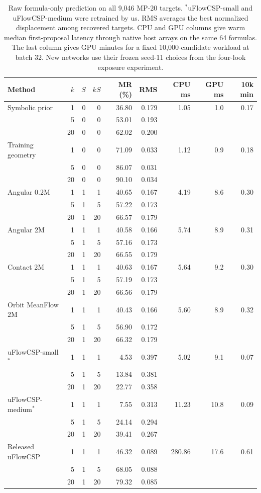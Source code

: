 \begin{table}[!htbp]\centering\small\setlength{\tabcolsep}{3.6pt}
\caption{Raw formula-only prediction on all 9,046 MP-20 targets. $^*$uFlowCSP-small and uFlowCSP-medium were retrained by us. RMS averages the best normalized displacement among recovered targets. CPU and GPU columns give warm median first-proposal latency through native host arrays on the same 64 formulas. The last column gives GPU minutes for a fixed 10,000-candidate workload at batch 32. New networks use their frozen seed-11 choices from the four-look exposure experiment.}\label{tab:main}
\begin{tabular}{lrrrrrrrr}\hline
Method & $k$ & $S$ & $kS$ & MR (\%) & RMS & CPU ms & GPU ms & 10k min\\\hline
Symbolic prior & 1 & 0 & 0 & 36.80 & 0.179 & 1.05 & 1.0 & 0.17\\
 & 5 & 0 & 0 & 53.01 & 0.193 &  &  & \\
 & 20 & 0 & 0 & 62.02 & 0.200 &  &  & \\
Training geometry & 1 & 0 & 0 & 71.09 & 0.033 & 1.12 & 0.9 & 0.18\\
 & 5 & 0 & 0 & 86.07 & 0.031 &  &  & \\
 & 20 & 0 & 0 & 90.10 & 0.034 &  &  & \\
Angular 0.2M & 1 & 1 & 1 & 40.65 & 0.167 & 4.19 & 8.6 & 0.30\\
 & 5 & 1 & 5 & 57.22 & 0.173 &  &  & \\
 & 20 & 1 & 20 & 66.57 & 0.179 &  &  & \\
Angular 2M & 1 & 1 & 1 & 40.58 & 0.166 & 5.74 & 8.9 & 0.31\\
 & 5 & 1 & 5 & 57.16 & 0.173 &  &  & \\
 & 20 & 1 & 20 & 66.55 & 0.179 &  &  & \\
Contact 2M & 1 & 1 & 1 & 40.63 & 0.167 & 5.64 & 9.2 & 0.30\\
 & 5 & 1 & 5 & 57.19 & 0.173 &  &  & \\
 & 20 & 1 & 20 & 66.56 & 0.179 &  &  & \\
Orbit MeanFlow 2M & 1 & 1 & 1 & 40.43 & 0.166 & 5.60 & 8.9 & 0.32\\
 & 5 & 1 & 5 & 56.90 & 0.172 &  &  & \\
 & 20 & 1 & 20 & 66.32 & 0.179 &  &  & \\
uFlowCSP-small$^*$ & 1 & 1 & 1 & 4.53 & 0.397 & 5.02 & 9.1 & 0.07\\
 & 5 & 1 & 5 & 13.84 & 0.381 &  &  & \\
 & 20 & 1 & 20 & 22.77 & 0.358 &  &  & \\
uFlowCSP-medium$^*$ & 1 & 1 & 1 & 7.55 & 0.313 & 11.23 & 10.8 & 0.09\\
 & 5 & 1 & 5 & 24.14 & 0.294 &  &  & \\
 & 20 & 1 & 20 & 39.41 & 0.267 &  &  & \\
Released uFlowCSP & 1 & 1 & 1 & 46.32 & 0.089 & 280.86 & 17.6 & 0.61\\
 & 5 & 1 & 5 & 68.05 & 0.088 &  &  & \\
 & 20 & 1 & 20 & 79.32 & 0.085 &  &  & \\
\hline\end{tabular}\end{table}

